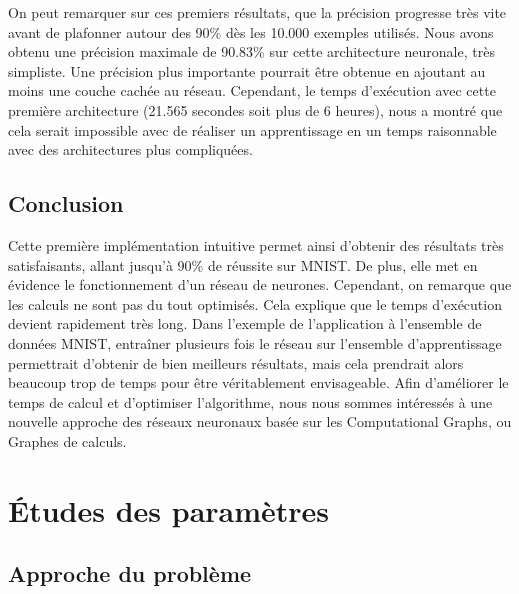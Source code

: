 \documentclass{report}
\theoremstyle{plain}
\theoremstyle{definition}
\theoremstyle{remark}
\begin{document}
On peut remarquer sur ces premiers résultats, que la précision progresse très vite avant de plafonner autour des 90\% dès les 10.000 exemples utilisés. Nous avons obtenu une précision maximale de 90.83\% sur cette architecture neuronale, très simpliste. Une précision plus importante pourrait être obtenue en ajoutant au moins une couche cachée au réseau. Cependant, le temps d'exécution avec cette première architecture (21.565 secondes soit plus de 6 heures), nous a montré que cela serait impossible avec de réaliser un apprentissage en un temps raisonnable avec des architectures plus compliquées.
\label{resultat_premiere_implementation}


\section{Conclusion}
Cette première implémentation intuitive permet ainsi d'obtenir des résultats très satisfaisants, allant jusqu'à 90\% de réussite sur MNIST. De plus, elle met en évidence le fonctionnement d'un réseau de neurones. Cependant, on remarque que les calculs ne sont pas du tout optimisés. Cela explique que le temps d'exécution devient rapidement très long. Dans l'exemple de l'application à l'ensemble de données MNIST, entraîner plusieurs fois le réseau sur l'ensemble d'apprentissage permettrait d'obtenir de bien meilleurs résultats, mais cela prendrait alors beaucoup trop de temps pour être véritablement envisageable.
Afin d'améliorer le temps de calcul et d'optimiser l'algorithme, nous nous sommes intéressés à une nouvelle approche des réseaux neuronaux basée sur les Computational Graphs, ou Graphes de calculs.



\chapter{Études des paramètres}

\section{Approche du problème}
\end{document}
